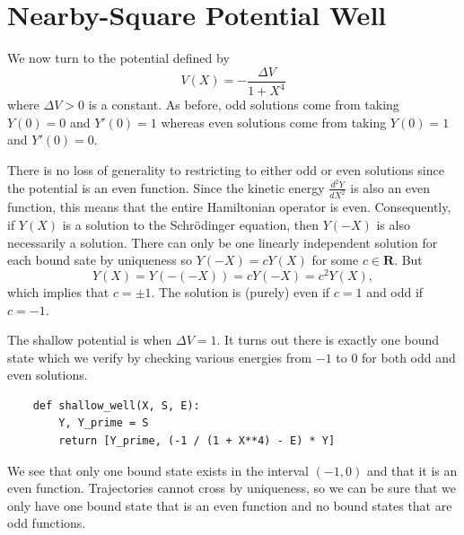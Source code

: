 \documentclass{article}
\begin{document}
\section{Nearby-Square Potential Well}

We now turn to the potential defined by
\[ V(X) = -\frac{\Delta V}{1+X^4} \]
where \(\Delta V > 0\) is a constant. As before, odd solutions come from taking \(Y(0) = 0\) and \(Y'(0) = 1\) whereas even solutions come from taking \(Y(0) = 1\) and \(Y'(0) = 0\). 

There is no loss of generality to restricting to either odd or even solutions since the potential is an even function. Since the kinetic energy \(\frac{d^2Y}{dX^2}\) is also an even function, this means that the entire Hamiltonian operator is even. Consequently, if \(Y(X)\) is a solution to the Schr\"odinger equation, then \(Y(-X)\) is also necessarily a solution. There can only be one linearly independent solution for each bound sate by uniqueness so \(Y(-X) = cY(X)\) for some \(c \in \mathbf{R}\). But
\[ Y(X) = Y(-(-X)) = cY(-X) = c^2Y(X), \]
which implies that \(c = \pm 1\). The solution is (purely) even if \(c = 1\) and odd if \(c = -1\).

The shallow potential is when \(\Delta V = 1\). It turns out there is exactly one bound state which we verify by checking various energies from \(-1\) to \(0\) for both odd and even solutions. 

\begin{verbatim}
    def shallow_well(X, S, E):
        Y, Y_prime = S
        return [Y_prime, (-1 / (1 + X**4) - E) * Y]
\end{verbatim}

We see that only one bound state exists in the interval \((-1,0)\) and that it is an even function. Trajectories cannot cross by uniqueness, so we can be sure that we only have one bound state that is an even function and no bound states that are odd functions.
\end{document}
